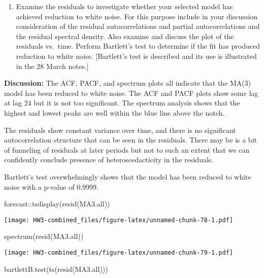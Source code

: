 \documentclass[
]{article}
\newenvironment{Shaded}{\begin{snugshade}}{\end{snugshade}}
\newcommand{\FunctionTok}[1]{\textcolor[rgb]{0.00,0.00,0.00}{#1}}
\newcommand{\NormalTok}[1]{#1}
\newcommand{\SpecialCharTok}[1]{\textcolor[rgb]{0.00,0.00,0.00}{#1}}
\providecommand{\tightlist}{%
  \setlength{\itemsep}{0pt}\setlength{\parskip}{0pt}}
\begin{document}
\begin{enumerate}
\def\labelenumi{(\roman{enumi})}
\setcounter{enumi}{3}
\tightlist
\item
  Examine the residuals to investigate whether your selected model has
  achieved reduction to white noise. For this purpose include in your
  discussion consideration of the residual autocorrelations and partial
  autocorrelations and the residual spectral density. Also examine and
  discuss the plot of the residuals vs.~time. Perform Bartlett's test to
  determine if the fit has produced reduction to white noise.
  {[}Bartlett's test is described and its use is illustrated in the 28
  March notes.{]}
\end{enumerate}

\textbf{Discussion:} The ACF, PACF, and spectrum plots all indicate that
the MA(3) model has been reduced to white noise. The ACF and PACF plots
show some lag at lag 24 but it is not too significant. The spectrum
analysis shows that the highest and lowest peaks are well within the
blue line above the notch.

The residuals show constant variance over time, and there is no
significant autocorrelation structure that can be seen in the residuals.
There may be is a bit of funneling of residuals at later periods but not
to such an extent that we can confidently conclude presence of
heteroscedacticity in the residuals.

Bartlett's test overwhelmingly shows that the model has been reduced to
white noise with a p-value of 0.9999.

\begin{Shaded}
\begin{Highlighting}[]
\NormalTok{forecast}\SpecialCharTok{::}\FunctionTok{tsdisplay}\NormalTok{(}\FunctionTok{resid}\NormalTok{(MA3.all))}
\end{Highlighting}
\end{Shaded}

\texttt{[image: HW3-combined\_files/figure-latex/unnamed-chunk-78-1.pdf]}

\begin{Shaded}
\begin{Highlighting}[]
\FunctionTok{spectrum}\NormalTok{(}\FunctionTok{resid}\NormalTok{(MA3.all))}
\end{Highlighting}
\end{Shaded}

\texttt{[image: HW3-combined\_files/figure-latex/unnamed-chunk-79-1.pdf]}

\begin{Shaded}
\begin{Highlighting}[]
\FunctionTok{bartlettB.test}\NormalTok{(}\FunctionTok{ts}\NormalTok{(}\FunctionTok{resid}\NormalTok{(MA3.all)))}
\end{Highlighting}
\end{Shaded}
\end{document}
